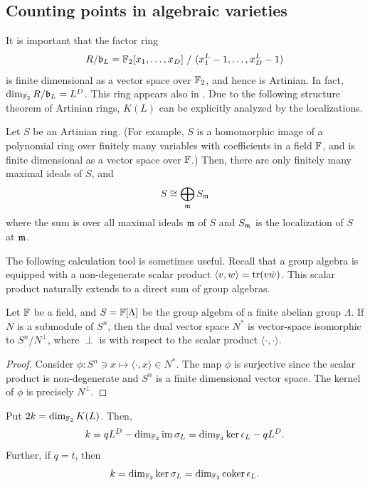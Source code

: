 \subsection{Counting points in algebraic varieties}
It is important that the factor ring
\[
 R/\mathfrak{b}_L = \mathbb{F}_2 [x_1, \ldots, x_D]~/~(x^L_1 -1,\ldots,x^L_D -1)
\]
is finite dimensional as a vector space over $\mathbb{F}_2$,
and hence is Artinian. In fact, $\dim_{\mathbb{F}_2} R/\mathfrak{b}_L = L^D$.
This ring appears also in \cite{GueneriOezbudak2008}.
Due to the following structure theorem of Artinian rings,
$K(L)$ can be explicitly analyzed by the localizations.
\begin{prop}
Let $S$ be an Artinian ring.
(For example, $S$ is a homomorphic image of a polynomial ring 
over finitely many variables with coefficients in a field $\mathbb{F}$,
and is finite dimensional as a vector space over $\mathbb{F}$.)
Then, there are only finitely many maximal ideals of $S$, and
\[
 S \cong \bigoplus_{\mathfrak{m}} S_{\mathfrak{m}}
\]
where the sum is over all maximal ideals $\mathfrak{m}$ of $S$ and $S_{\mathfrak{m}}$ is the localization of $S$ at $\mathfrak{m}$. 
\label{prop:Artin-ring}
\end{prop}
The following calculation tool is sometimes useful.
Recall that a group algebra is equipped with a non-degenerate 
scalar product $\langle v,w \rangle = \mathop{\mathrm{tr}}\nolimits (v \bar w)$.
This scalar product naturally extends to a direct sum of group algebras.
\begin{lem}
Let $\mathbb{F}$ be a field,
and $S = \mathbb{F}[\Lambda]$ be the group algebra of a finite abelian group $\Lambda$.
If $N$ is a submodule of $S^n$, then the dual vector space $N^*$
is vector-space isomorphic to $S^n / N^\perp$,
where $\perp$ is with respect to the scalar product $\langle \cdot , \cdot \rangle$.
\end{lem}
\begin{proof}
Consider $\phi : S^n \ni x \mapsto \langle \cdot, x \rangle \in N^*$.
The map $\phi$ is surjective since the scalar product is non-degenerate
and $S^n$ is a finite dimensional vector space.
The kernel of $\phi$ is precisely $N^\perp$.
\end{proof}
\begin{cor}
Put $2k = \dim_{\mathbb{F}_2} K(L)$. Then,
\[
 k = qL^D - \dim_{\mathbb{F}_2} \mathop{\mathrm{im}}\nolimits \sigma_L = \dim_{\mathbb{F}_2} \ker \epsilon_L - qL^D.
\]
Further, if $q=t$, then
\[
 k = \dim_{\mathbb{F}_2} \ker \sigma_L = \dim_{\mathbb{F}_2} \mathop{\mathrm{coker}}\nolimits \epsilon_L .
\]
\label{cor:k-formulas}
\end{cor}
